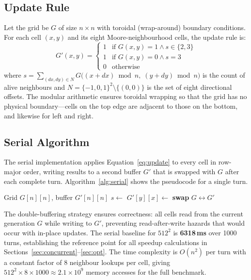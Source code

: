 \documentclass[10pt,twocolumn]{article}
\begin{document}
\subsection{Update Rule}\label{sec:update}

Let the grid be $G$ of size $n\times n$ with toroidal (wrap-around) boundary conditions.  For each cell $(x,y)$ and its eight Moore-neighbourhood cells, the update rule is:
\begin{equation}\label{eq:update}
G'(x,y) = \begin{cases}
1 & \text{if } G(x,y)=1 \wedge s\in\{2,3\}\\
1 & \text{if } G(x,y)=0 \wedge s=3\\
0 & \text{otherwise}
\end{cases}
\end{equation}
where $s = \sum_{(dx,dy)\in N} G\!\bigl((x{+}dx)\bmod n,\;(y{+}dy)\bmod n\bigr)$ is the count of alive neighbours and $N = \{-1,0,1\}^2 \setminus \{(0,0)\}$ is the set of eight directional offsets.
The modular arithmetic ensures toroidal wrapping so that the grid has no physical boundary---cells on the top edge are adjacent to those on the bottom, and likewise for left and right.

\subsection{Serial Algorithm}\label{sec:serial_algo}

The serial implementation applies Equation~\eqref{eq:update} to every cell in row-major order, writing results to a second buffer $G'$ that is swapped with $G$ after each complete turn.
Algorithm~\ref{alg:serial} shows the pseudocode for a single turn.

\begin{algorithm}[h]
\caption{Serial GoL Update (one turn)}\label{alg:serial}
\begin{algorithmic}[1]
\small
\Require Grid $G[n][n]$, buffer $G'[n][n]$
    \State $s \gets$ 
    \State $G'[y][x] \gets$ 
  \EndFor
\EndFor
\State \textbf{swap} $G \leftrightarrow G'$
\end{algorithmic}
\end{algorithm}

The double-buffering strategy ensures correctness: all cells read from the current generation $G$ while writing to $G'$, preventing read-after-write hazards that would occur with in-place updates.
The serial baseline for $512^2$ is \textbf{6318\,ms} over 1000 turns, establishing the reference point for all speedup calculations in Sections~\ref{sec:concurrent}--\ref{sec:opt}.
The time complexity is $O(n^2)$ per turn with a constant factor of 8 neighbour lookups per cell, giving $512^2 \times 8 \times 1000 \approx 2.1 \times 10^9$ memory accesses for the full benchmark.
\end{document}
